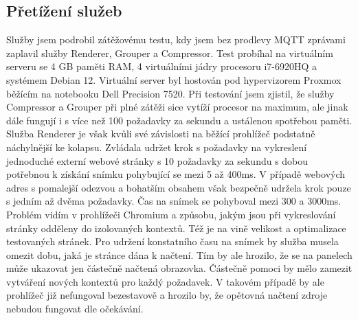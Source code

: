 \subsection{Přetížení služeb}
Služby jsem podrobil zátěžovému testu, kdy jsem bez prodlevy MQTT zprávami zaplavil služby Renderer, Grouper a Compressor. Test probíhal na virtuálním serveru se 4 GB paměti RAM, 4 virtuálními jádry procesoru i7-6920HQ a systémem Debian 12. Virtuální server byl hostován pod hypervizorem Proxmox běžícím na notebooku Dell Precision 7520. Při testování jsem zjistil, že služby Compressor a Grouper při plné zátěži sice vytíží procesor na maximum, ale jinak dále fungují i s více než 100 požadavky za sekundu a ustálenou spotřebou paměti. Služba Renderer je však kvůli své závislosti na běžící prohlížeč podstatně náchylnější ke kolapsu. Zvládala udržet krok s požadavky na vykreslení jednoduché externí webové stránky s 10 požadavky za sekundu s dobou potřebnou k získání snímku pohybující se mezi 5 až 400ms. V případě webových adres s pomalejší odezvou a bohatším obsahem však bezpečně udržela krok pouze s jedním až dvěma požadavky. Čas na snímek se pohyboval mezi 300 a 3000ms. Problém vidím v prohlížeči Chromium a způsobu, jakým jsou při vykreslování stránky odděleny do izolovaných kontextů. Též je na vině velikost a optimalizace testovaných stránek. Pro udržení konstatního času na snímek by služba musela omezit dobu, jaká je stránce dána k načtení. Tím by ale hrozilo, že se na panelech může ukazovat jen částečně načtená obrazovka. Částečně pomoci by mělo zamezit vytváření nových kontextů pro každý požadavek. V takovém případě by ale prohlížeč již nefungoval bezestavově a hrozilo by, že opětovná načtení zdroje nebudou fungovat dle očekávání.
